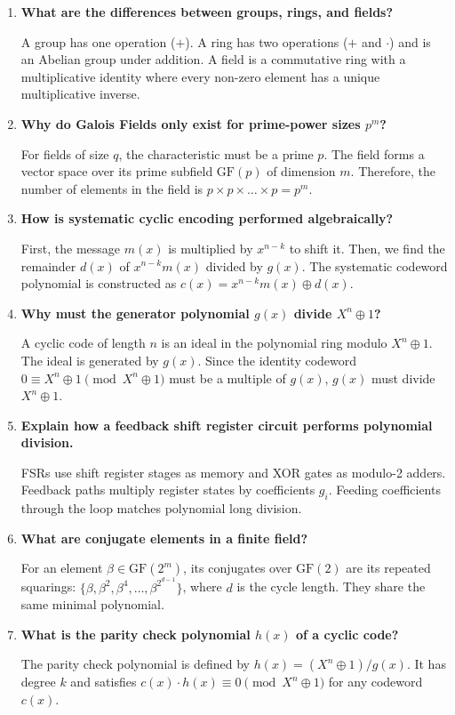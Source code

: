 \documentclass[12pt,a4paper]{article}
\newcommand{\Q}[1]{\textbf{#1}\par\noindent\ignorespaces}
\begin{document}
\begin{tcolorbox}[exambox, title={\textbf{Frequently Asked / Viva Questions}}]
\begin{enumerate}[topsep=0pt, label=\textbf{Q\arabic*.}, itemsep=5pt]
  \item \Q{What are the differences between groups, rings, and fields?}
    A group has one operation ($+$). A ring has two operations ($+$ and $\cdot$) and is an Abelian group under addition. A field is a commutative ring with a multiplicative identity where every non-zero element has a unique multiplicative inverse.
  \item \Q{Why do Galois Fields only exist for prime-power sizes $p^m$?}
    For fields of size $q$, the characteristic must be a prime $p$. The field forms a vector space over its prime subfield $\text{GF}(p)$ of dimension $m$. Therefore, the number of elements in the field is $p \times p \times \dots \times p = p^m$.
  \item \Q{How is systematic cyclic encoding performed algebraically?}
    First, the message $m(x)$ is multiplied by $x^{n-k}$ to shift it. Then, we find the remainder $d(x)$ of $x^{n-k}m(x)$ divided by $g(x)$. The systematic codeword polynomial is constructed as $c(x) = x^{n-k}m(x) \oplus d(x)$.
  \item \Q{Why must the generator polynomial $g(x)$ divide $X^n \oplus 1$?}
    A cyclic code of length $n$ is an ideal in the polynomial ring modulo $X^n \oplus 1$. The ideal is generated by $g(x)$. Since the identity codeword $0 \equiv X^n \oplus 1 \pmod{X^n \oplus 1}$ must be a multiple of $g(x)$, $g(x)$ must divide $X^n \oplus 1$.
  \item \Q{Explain how a feedback shift register circuit performs polynomial division.}
    FSRs use shift register stages as memory and XOR gates as modulo-2 adders. Feedback paths multiply register states by coefficients $g_i$. Feeding coefficients through the loop matches polynomial long division.
  \item \Q{What are conjugate elements in a finite field?}
    For an element $\beta \in \text{GF}(2^m)$, its conjugates over $\text{GF}(2)$ are its repeated squarings: $\{\beta, \beta^2, \beta^4, \dots, \beta^{2^{d-1}}\}$, where $d$ is the cycle length. They share the same minimal polynomial.
  \item \Q{What is the parity check polynomial $h(x)$ of a cyclic code?}
    The parity check polynomial is defined by $h(x) = (X^n \oplus 1) / g(x)$. It has degree $k$ and satisfies $c(x) \cdot h(x) \equiv 0 \pmod{X^n \oplus 1}$ for any codeword $c(x)$.

\end{enumerate}
\end{tcolorbox}
\end{document}
